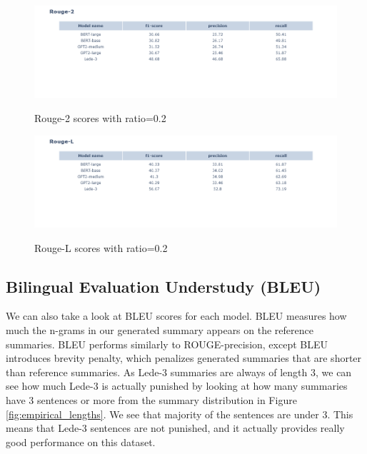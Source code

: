 \documentclass{article}
\begin{document}
\begin{figure}[H]
	\centering
	\hspace*{-3cm}
	\includegraphics[scale=0.55]{rouge2.png}\\
	\caption{Rouge-2 scores with ratio=0.2}
	\label{fig:rouge2_02}
\end{figure}

\begin{figure}[H]
	\centering
	\hspace*{-3cm}
	\includegraphics[scale=0.55]{rougel.png}\\
	\caption{Rouge-L scores with ratio=0.2}
	\label{fig:rougel_02}
\end{figure}

\subsection{Bilingual Evaluation Understudy (BLEU)}

\noindent
We can also take a look at BLEU scores for each model. BLEU measures how much the n-grams in our generated summary appears on the reference summaries. BLEU performs similarly to ROUGE-precision, except BLEU introduces brevity penalty, which penalizes generated summaries that are shorter than reference summaries. As Lede-3 summaries are always of length 3, we can see how much Lede-3 is actually punished by looking at how many summaries have 3 sentences or more from the summary distribution in Figure \ref{fig:empirical_lengths}. We see that majority of the sentences are under 3. This means that Lede-3 sentences are not punished, and it actually provides really good performance on this dataset. 
\end{document}
